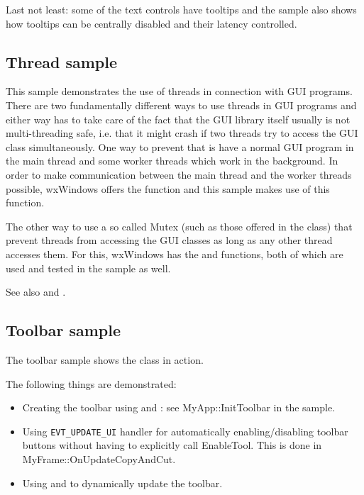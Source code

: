 Last not least: some of the text controls have tooltips and the sample also shows
how tooltips can be centrally disabled and their latency controlled.

\subsection{Thread sample}\label{samplethread}

This sample demonstrates the use of threads in connection with GUI programs.
There are two fundamentally different ways to use threads in GUI programs and
either way has to take care of the fact that the GUI library itself usually
is not multi-threading safe, i.e. that it might crash if two threads try to
access the GUI class simultaneously. One way to prevent that is have a normal
GUI program in the main thread and some worker threads which work in the 
background. In order to make communication between the main thread and the
worker threads possible, wxWindows offers the  
function and this sample makes use of this function.

The other way to use a so called Mutex (such as those offered in the  
class) that prevent threads from accessing the GUI classes as long as any other
thread accesses them. For this, wxWindows has the  
and  functions, both of which are
used and tested in the sample as well.

See also  and .

\subsection{Toolbar sample}\label{sampletoolbar}

The toolbar sample shows the  class in action.

The following things are demonstrated:

\begin{itemize}\itemsep=0pt
\item Creating the toolbar using  
and : see
MyApp::InitToolbar in the sample.
\item Using {\tt EVT\_UPDATE\_UI} handler for automatically enabling/disabling
toolbar buttons without having to explicitly call EnableTool. This is done
in MyFrame::OnUpdateCopyAndCut.
\item Using  and 
 to dynamically update the
toolbar.
\end{itemize}

